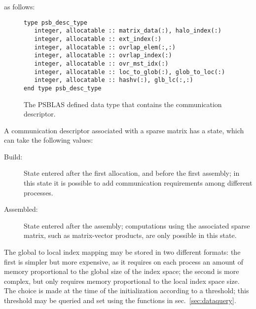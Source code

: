 as follows:
\begin{figure}[h!]
  \begin{Sbox}
    \begin{minipage}[tl]{0.9\textwidth}
\begin{verbatim} 
type psb_desc_type 
   integer, allocatable :: matrix_data(:), halo_index(:)
   integer, allocatable :: ext_index(:)
   integer, allocatable :: ovrlap_elem(:,:)
   integer, allocatable :: ovrlap_index(:)
   integer, allocatable :: ovr_mst_idx(:)
   integer, allocatable :: loc_to_glob(:), glob_to_loc(:)
   integer, allocatable :: hashv(:), glb_lc(:,:)
end type psb_desc_type 
\end{verbatim}
    \end{minipage}
  \end{Sbox}
  \setlength{\fboxsep}{8pt}
  \begin{center}
    \fbox{\TheSbox}
  \end{center}
  \caption{\label{fig:desctype}The PSBLAS defined data type that
    contains the communication descriptor.}
\end{figure}

A communication descriptor associated with a sparse  matrix has a
state, which can take the following values:
\begin{description}
\item[Build:] State entered after the first allocation, and before the
  first assembly; in this state it is possible to add communication
  requirements among different processes. 
\item[Assembled:] State entered after the assembly; computations using
  the associated sparse matrix, such as matrix-vector products, are
  only possible   in this state.
\end{description}
The global to local index  mapping may be stored in two different
formats: the first is simpler but more expensive, as it requires on
each process an amount of memory proportional to the global size of
the index space; the second is more complex, but only requires memory
proportional to the local index space size. The choice is made at the
time of the initialization according to a threshold; this threshold
may be queried and set using the functions in
sec.~\ref{sec:dataquery}. 

